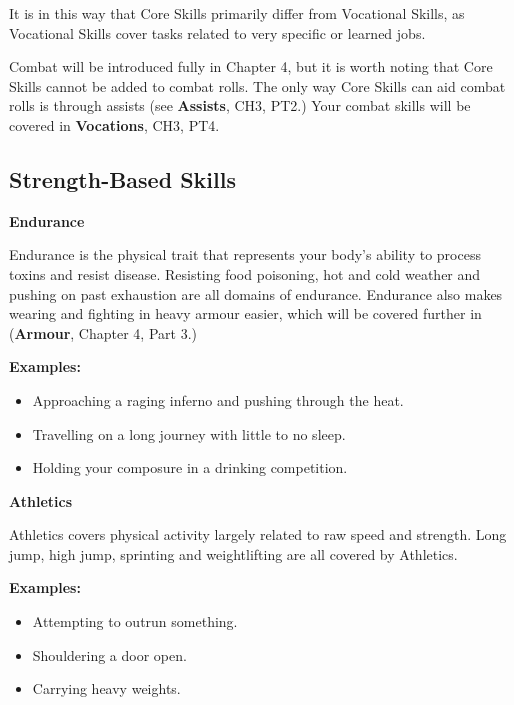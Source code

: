 It is in this way that Core Skills primarily differ from Vocational Skills, as Vocational Skills cover tasks related to very specific or learned jobs.

Combat will be introduced fully in Chapter 4, but it is worth noting that Core Skills cannot be added to combat rolls. The only way Core Skills can aid combat rolls is through assists (see \textbf{Assists}, CH3, PT2.) Your combat skills will be covered in \textbf{Vocations}, CH3, PT4. %

\subsection{Strength-Based Skills} \label{subsec:strength_based_skills}

\textbf{Endurance}

Endurance is the physical trait that represents your body’s ability to process toxins and resist disease. Resisting food poisoning, hot and cold weather and pushing on past exhaustion are all domains of endurance. Endurance also makes wearing and fighting in heavy armour easier, which will be covered further in (\textbf{Armour}, Chapter 4, Part 3.) %

\begin{displayquote}
    \textbf{Examples:}
    \begin{itemize}
        \item Approaching a raging inferno and pushing through the heat.
        \item Travelling on a long journey with little to no sleep.
        \item Holding your composure in a drinking competition.
    \end{itemize}
\end{displayquote}

\textbf{Athletics}

Athletics covers physical activity largely related to raw speed and strength. Long jump, high jump, sprinting and weightlifting are all covered by Athletics.

\begin{displayquote}
    \textbf{Examples:}
    \begin{itemize}
        \item Attempting to outrun something.
        \item Shouldering a door open.
        \item Carrying heavy weights.
    \end{itemize}
\end{displayquote}

